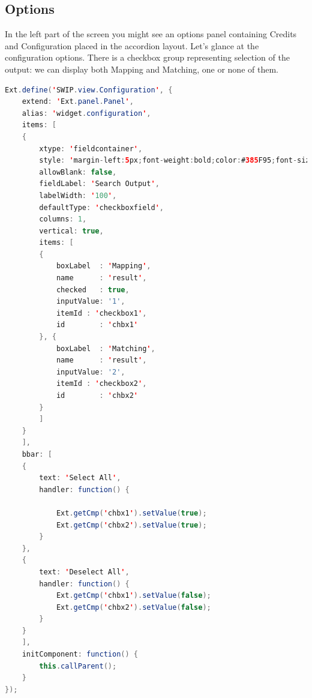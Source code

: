 \subsection{Options}
\par In the left part of the screen you might see an options panel containing Credits and Configuration placed in the accordion layout. Let's glance at the configuration options. There is a checkbox group representing selection of the output: we can display both Mapping and Matching, one or none of them.\\ 
\begin{lstlisting}[language=Java]
Ext.define('SWIP.view.Configuration', {
    extend: 'Ext.panel.Panel',
    alias: 'widget.configuration',
    items: [
    {
        xtype: 'fieldcontainer',
        style: 'margin-left:5px;font-weight:bold;color:#385F95;font-size: 13px;',
        allowBlank: false,
        fieldLabel: 'Search Output',
        labelWidth: '100',
        defaultType: 'checkboxfield',
        columns: 1,
        vertical: true,
        items: [ 
        {
            boxLabel  : 'Mapping',
            name      : 'result',
            checked   : true,
            inputValue: '1',
            itemId : 'checkbox1',
            id        : 'chbx1'
        }, {
            boxLabel  : 'Matching',
            name      : 'result',
            inputValue: '2',
            itemId : 'checkbox2',
            id        : 'chbx2'
        } 
        ]
    }
    ],
    bbar: [
    {
        text: 'Select All',
        handler: function() {
      
            Ext.getCmp('chbx1').setValue(true);
            Ext.getCmp('chbx2').setValue(true);
        }
    },
    {
        text: 'Deselect All',
        handler: function() {
            Ext.getCmp('chbx1').setValue(false);
            Ext.getCmp('chbx2').setValue(false);
        }
    }
    ],
    initComponent: function() {
        this.callParent();
    }
});
\end{lstlisting}


